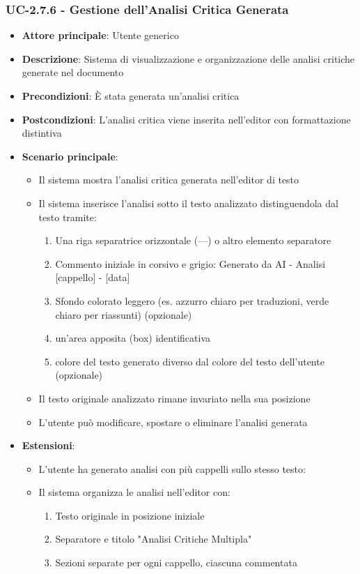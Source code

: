 \documentclass[11pt,a4paper]{article}
\begin{document}
\subsubsection{UC-2.7.6 - Gestione dell'Analisi Critica Generata}
\begin{itemize}
    \item \textbf{Attore principale}: Utente generico
    \item \textbf{Descrizione}: Sistema di visualizzazione e organizzazione delle analisi critiche generate nel documento
    \item \textbf{Precondizioni}: È stata generata un'analisi critica
    \item \textbf{Postcondizioni}: L'analisi critica viene inserita nell'editor con formattazione distintiva
    \item \textbf{Scenario principale}:
        \begin{itemize}
            \item Il sistema mostra l'analisi critica generata nell'editor di testo
            \item Il sistema inserisce l'analisi sotto il testo analizzato distinguendola dal testo tramite:
                \begin{enumerate}
                    \item Una riga separatrice orizzontale (---) o altro elemento separatore
                    \item Commento iniziale in corsivo e grigio: Generato da AI - Analisi [cappello] - [data]
                    \item Sfondo colorato leggero (es. azzurro chiaro per traduzioni, verde chiaro per riassunti) (opzionale)
                    \item un’area apposita (box) identificativa
                    \item colore del testo generato diverso dal colore del testo dell’utente (opzionale)
                \end{enumerate}
            \item Il testo originale analizzato rimane invariato nella sua posizione
            \item L'utente può modificare, spostare o eliminare l'analisi generata
        \end{itemize}
    \item \textbf{Estensioni}:
        \begin{itemize}
            \item L'utente ha generato analisi con più cappelli sullo stesso testo:
            \item Il sistema organizza le analisi nell'editor con:
                \begin{enumerate}
                    \item Testo originale in posizione iniziale
                    \item Separatore e titolo "Analisi Critiche Multipla"
                    \item Sezioni separate per ogni cappello, ciascuna commentata
                \end{enumerate}
        \end{itemize}
\end{itemize}
\end{document}
